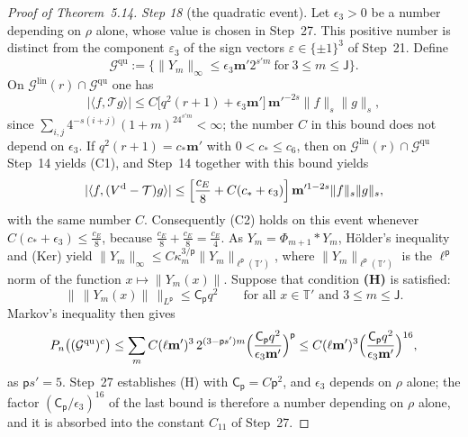 \documentclass[11pt,letterpaper,reqno]{amsart}
\theoremstyle{definition}
\begin{document}
\begin{proof}[Proof of Theorem~5.14]
\emph{Step 18} (the quadratic event).
Let $\epsilon_3>0$ be a number depending on $\rho$ alone, whose value is chosen in Step~27.
This positive number is distinct from the component $\varepsilon_3$ of the sign vectors $\varepsilon\in\{\pm1\}^3$ of Step~21.
Define
\begin{equation*}
\mathcal G^{\mathrm{qu}}:=\bigl\{\|Y_m\|_\infty\le\epsilon_3\mathbf m'2^{s'm}\ \text{for}\ 3\le m\le\mathsf J\bigr\}.
\end{equation*}
On $\mathcal G^{\mathrm{lin}}(r)\cap\mathcal G^{\mathrm{qu}}$ one has
\begin{equation*}
|\langle f,\mathcal Tg\rangle|\le C\bigl[q^2(r+1)+\epsilon_3\mathbf m'\bigr]\,\mathbf m'^{-2s}\|f\|_s\|g\|_s,
\end{equation*}
since $\sum_{i,j}4^{-s(i+j)}(1+m)^24^{s'm}<\infty$;
the number $C$ in this bound does not depend on $\epsilon_3$.
If $q^2(r+1)=c_*\mathbf m'$ with $0<c_*\le c_6$, then on $\mathcal G^{\mathrm{lin}}(r)\cap\mathcal G^{\mathrm{qu}}$ Step~14 yields (C1), and Step~14 together with this bound yields
\begin{equation*}
|\langle f,(V^{\mathrm d}-\mathcal T)g\rangle|\le\Bigl[\frac{c_E}{8}+C(c_*+\epsilon_3)\Bigr]\,\mathbf m'^{1-2s}\|f\|_s\|g\|_s,
\end{equation*}
with the same number $C$.
Consequently (C2) holds on this event whenever $C(c_*+\epsilon_3)\le\frac{c_E}{8}$, because $\frac{c_E}{8}+\frac{c_E}{8}=\frac{c_E}{4}$.
As $Y_m=\Phi_{m+1}*Y_m$, H\"older's inequality and (Ker) yield $\|Y_m\|_\infty\le C\kappa_m^{3/\mathsf p}\|Y_m\|_{\ell^{\mathsf p}(\mathbb T')}$, where $\|Y_m\|_{\ell^{\mathsf p}(\mathbb T')}$ is the $\ell^{\mathsf p}$ norm of the function $x\mapsto\|Y_m(x)\|$.
Suppose that condition \textbf{(H)} is satisfied:
\begin{equation*}
\bigl\|\,\|Y_m(x)\|\,\bigr\|_{L^{\mathsf p}}\le\mathsf C_{\mathsf p}q^2\qquad\text{for all }x\in\mathbb T'\text{ and }3\le m\le\mathsf J.
\end{equation*}
Markov's inequality then gives
\begin{equation*}
P_n\bigl((\mathcal G^{\mathrm{qu}})^c\bigr)\le\sum_mC(\ell\mathbf m')^3\,2^{(3-\mathsf ps')m}\Bigl(\frac{\mathsf C_{\mathsf p}q^2}{\epsilon_3\mathbf m'}\Bigr)^{\mathsf p}\le C(\ell\mathbf m')^3\Bigl(\frac{\mathsf C_{\mathsf p}q^2}{\epsilon_3\mathbf m'}\Bigr)^{16},
\end{equation*}
as $\mathsf ps'=5$.
Step~27 establishes (H) with $\mathsf C_{\mathsf p}=C\mathsf p^2$, and $\epsilon_3$ depends on $\rho$ alone;
the factor $(\mathsf C_{\mathsf p}/\epsilon_3)^{16}$ of the last bound is therefore a number depending on $\rho$ alone, and it is absorbed into the constant $C_{11}$ of Step~27.


\end{proof}
\end{document}
